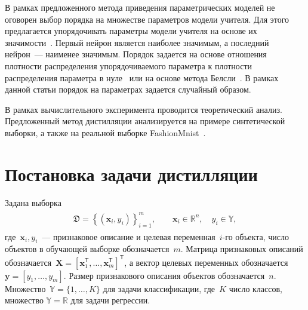 \documentclass[12pt]{a&t}
\begin{document}
В рамках предложенного метода приведения параметрических моделей не оговорен выбор порядка на множестве параметров модели учителя.
Для этого предлагается упорядочивать параметры модели учителя на основе их значимости~\cite{LeCun1990}.
Первый нейрон является наиболее значимым, а последний нейрон~--- наименее значимым.
Порядок задается на основе отношения плотности распределения упорядочиваемого параметра к плотности распределения параметра в нуле~\cite{graves2011} или на основе метода Белсли~\cite{grabovoy2019}.
В рамках данной статьи порядок на параметрах задается случайный образом.

В рамках вычислительного эксперимента проводится теоретический анализ. Предложенный метод дистилляции анализируется на примере синтетической выборки, а также на реальной выборке FashionMnist~\cite{fashionmnist}.

\section{Постановка задачи дистилляции}
Задана выборка
\begin{gather}
\label{eq:st:1}
\begin{aligned}
\mathfrak{D} = \left\{\left(\mathbf{x}_i, y_i\right)\right\}_{i=1}^{m}, \qquad \mathbf{x}_i \in \mathbb{R}^{n}, \quad y_i \in \mathbb{Y},
\end{aligned}
\end{gather}
где~$\mathbf{x}_i, y_i$~--- признаковое описание и целевая переменная~$i$-го объекта, число объектов в обучающей выборке обозначается~$m$. Матрица признаковых описаний обозначается~$\mathbf{X}=\left[\mathbf{x}_1^{\mathsf{T}}, \ldots, \mathbf{x}_m^{\mathsf{T}}\right]^{\mathsf{T}}$, а вектор целевых переменных обозначается~$\mathbf{y}=\left[y_1, \ldots, y_m\right]$. Размер признакового описания объектов обозначается~$n$. Множество~$\mathbb{Y}=\{1,\ldots,K\}$ для задачи классификации, где~$K$ число классов, множество $\mathbb{Y}=\mathbb{R}$ для задачи регрессии.
\end{document}
